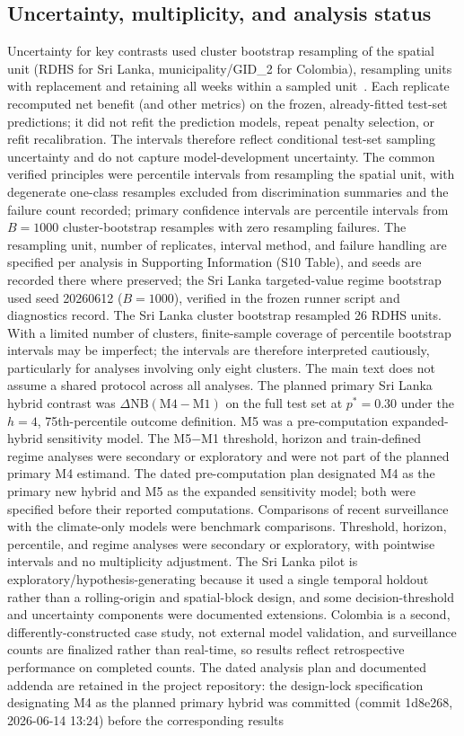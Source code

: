 \documentclass[11pt,a4paper]{article}
\begin{document}
\subsection{Uncertainty, multiplicity, and analysis status}
Uncertainty for key contrasts used cluster bootstrap resampling of the spatial unit (RDHS for Sri Lanka, municipality/GID\_2 for Colombia), resampling units with replacement and retaining all weeks within a sampled unit~\cite{CameronGelbachMiller2008}. Each replicate recomputed net benefit (and other metrics) on the frozen, already-fitted test-set predictions; it did not refit the prediction models, repeat penalty selection, or refit recalibration. The intervals therefore reflect conditional test-set sampling uncertainty and do not capture model-development uncertainty. The common verified principles were percentile intervals from resampling the spatial unit, with degenerate one-class resamples excluded from discrimination summaries and the failure count recorded; primary confidence intervals are percentile intervals from $B=1000$ cluster-bootstrap resamples with zero resampling failures. The resampling unit, number of replicates, interval method, and failure handling are specified per analysis in Supporting Information (S10 Table), and seeds are recorded there where preserved; the Sri Lanka targeted-value regime bootstrap used seed 20260612 ($B=1000$), verified in the frozen runner script and diagnostics record. The Sri Lanka cluster bootstrap resampled 26 RDHS units. With a limited number of clusters, finite-sample coverage of percentile bootstrap intervals may be imperfect; the intervals are therefore interpreted cautiously, particularly for analyses involving only eight clusters. The main text does not assume a shared protocol across all analyses. The planned primary Sri Lanka hybrid contrast was $\Delta\mathrm{NB}(\text{M4}-\text{M1})$ on the full test set at $p^*=0.30$ under the $h=4$, 75th-percentile outcome definition. M5 was a pre-computation expanded-hybrid sensitivity model. The M5$-$M1 threshold, horizon and train-defined regime analyses were secondary or exploratory and were not part of the planned primary M4 estimand. The dated pre-computation plan designated M4 as the primary new hybrid and M5 as the expanded sensitivity model; both were specified before their reported computations. Comparisons of recent surveillance with the climate-only models were benchmark comparisons. Threshold, horizon, percentile, and regime analyses were secondary or exploratory, with pointwise intervals and no multiplicity adjustment. The Sri Lanka pilot is exploratory/hypothesis-generating because it used a single temporal holdout rather than a rolling-origin and spatial-block design, and some decision-threshold and uncertainty components were documented extensions. Colombia is a second, differently-constructed case study, not external model validation, and surveillance counts are finalized rather than real-time, so results reflect retrospective performance on completed counts. The dated analysis plan and documented addenda are retained in the project repository: the design-lock specification designating M4 as the planned primary hybrid was committed (commit 1d8e268, 2026-06-14 13:24) before the corresponding results 
\end{document}
